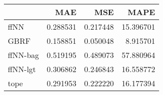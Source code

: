 \begin{tabular}{lrrr}
\toprule
{} &       MAE &       MSE &       MAPE \\
\midrule
ffNN     &  0.288531 &  0.217448 &  15.396701 \\
GBRF     &  0.158851 &  0.050048 &   8.915701 \\
ffNN-bag &  0.519195 &  0.489073 &  57.880964 \\
ffNN-lgt &  0.306862 &  0.246843 &  16.558772 \\
tope     &  0.291953 &  0.222220 &  16.177394 \\
\bottomrule
\end{tabular}
